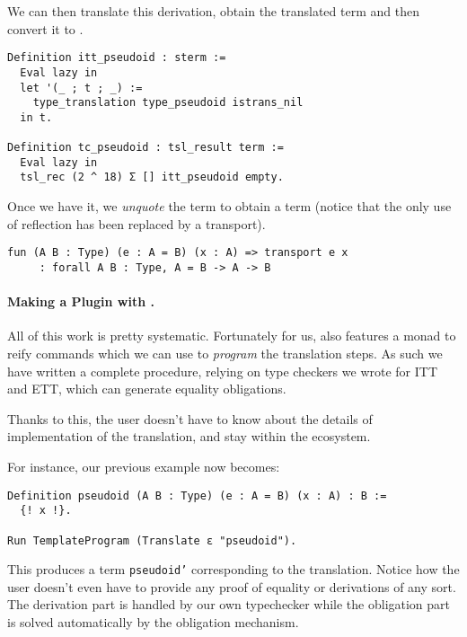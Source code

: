 %
We can then translate this derivation, obtain the translated term and then
convert it to \MetaCoq.
%
\begin{verbatim}
Definition itt_pseudoid : sterm :=
  Eval lazy in
  let '(_ ; t ; _) :=
    type_translation type_pseudoid istrans_nil
  in t.

Definition tc_pseudoid : tsl_result term :=
  Eval lazy in
  tsl_rec (2 ^ 18) Σ [] itt_pseudoid empty.
\end{verbatim}
%
Once we have it, we \emph{unquote} the term to obtain a \Coq term
(notice that the only use of reflection has been replaced by a transport).
%
\begin{verbatim}
fun (A B : Type) (e : A = B) (x : A) => transport e x
     : forall A B : Type, A = B -> A -> B
\end{verbatim}

\paragraph{Making a Plugin with \MetaCoq.}
%
All of this work is pretty systematic. Fortunately for us,
\MetaCoq also features a monad to reify \Coq commands which we can
use to \emph{program} the translation steps.
As such we have written a complete procedure, relying on type checkers we
wrote for \acrshort{ITT} and \acrshort{ETT}, which can generate equality
obligations.

Thanks to this, the user doesn't have to know about the details of
implementation of the translation, and stay within the \Coq ecosystem.

For instance, our previous example now becomes:
%
\begin{verbatim}
Definition pseudoid (A B : Type) (e : A = B) (x : A) : B :=
  {! x !}.

Run TemplateProgram (Translate ε "pseudoid").
\end{verbatim}
%
This produces a \Coq term \texttt{pseudoid'} corresponding to the
translation.
Notice how the user doesn't even have to provide any proof of equality or
derivations of any sort. The derivation part is handled by our own typechecker
while the obligation part is solved automatically by the \Coq obligation mechanism.


